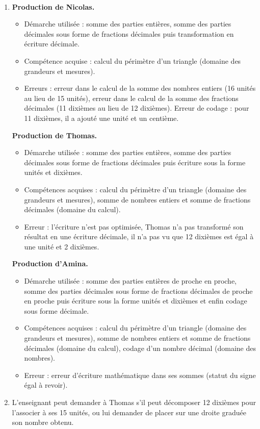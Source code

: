 \ \\ [-5mm]
\begin{enumerate}
   \item {\bf Production de Nicolas.}
   \begin{itemize}
      \item Démarche utilisée : somme des parties entières, somme des parties décimales sous forme de fractions décimales puis transformation en écriture décimale.
      \item Compétence acquise : calcul du périmètre d'un triangle (domaine des grandeurs et mesures).
      \item Erreurs : erreur dans le calcul de la somme des nombres entiers (16 unités au lieu de 15 unités), erreur dans le calcul de la somme des fractions décimales (11 dixièmes au lieu de 12 dixièmes). Erreur de codage : pour 11 dixièmes, il a ajouté une unité et un centième.
   \end{itemize}
   \smallskip
    {\bf Production de Thomas.}
   \begin{itemize}
       \item Démarche utilisée : somme des parties entières, somme des parties décimales sous forme de fractions décimales puis écriture sous la forme unités et dixièmes.
      \item Compétences acquises : calcul du périmètre d'un triangle (domaine des grandeurs et mesures), somme de nombres entiers et somme de fractions décimales (domaine du calcul).
      \item Erreur : l'écriture n'est pas optimisée, Thomas n'a pas transformé son résultat en une écriture décimale, il n'a pas \og vu \fg{} que 12 dixièmes est égal à une unité et 2 dixièmes.
   \end{itemize}
   \smallskip
   {\bf Production d'Amina.}
   \begin{itemize}
       \item Démarche utilisée : somme des parties entières de proche en proche, somme des parties décimales sous forme de fractions décimales de proche en proche puis écriture sous la forme unités et dixièmes et enfin codage sous forme décimale.
      \item Compétences acquises : calcul du périmètre d'un triangle (domaine des grandeurs et mesures), somme de nombres entiers et somme de fractions décimales (domaine du calcul), codage d'un nombre décimal (domaine des nombres).
      \item Erreur : erreur d'écriture mathématique dans ses sommes (statut du signe égal à revoir).
   \end{itemize}
   \item L'enseignant peut demander à Thomas s'il peut décomposer 12 dixièmes pour l'associer à ses 15 unités, ou lui demander de placer sur une droite graduée son nombre obtenu.
\end{enumerate}
